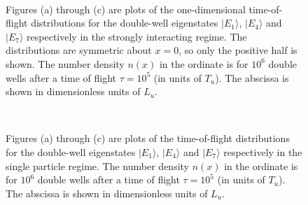 \begin{figure}
\ 
\caption{Figures (a) through (c) are plots of the one-dimensional time-of-flight distributions for the double-well eigenstates $| E_1\rangle$, $| E_4\rangle$ and $| E_7\rangle$ respectively in the strongly interacting regime. The distributions are symmetric about $x=0$, so only the positive half is shown. The number density $n(x)$ in the ordinate is for $10^6$ double wells after a time of flight $\tau = 10^5$ (in units of $T_u$). The abscissa is shown in dimensionless units of $L_u$. }
\label{fig:tof_1lakh_tonks:appendixtof}
\end{figure}

\begin{figure}
\ 
\caption{Figures (a) through (c) are plots of the time-of-flight distributions for the double-well eigenstates $| E_1\rangle$, $| E_4\rangle$ and $| E_7\rangle$ respectively in the single particle regime. The number density $n(x)$ in the ordinate is for $10^6$ double wells after a time of flight $\tau = 10^5$ (in units of $T_u$). The abscissa is shown in dimensionless units of $L_u$.}
\label{fig:tof_1lakh:appendixtof}
\end{figure}
